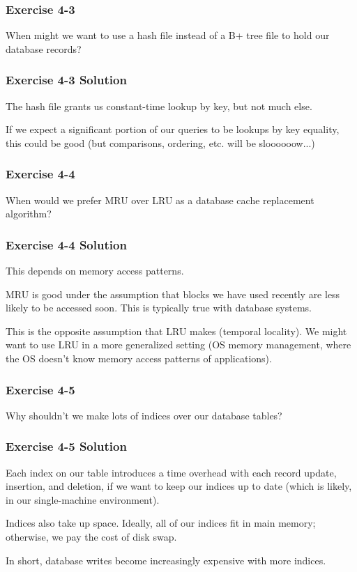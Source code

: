 \begin{frame}
\frametitle{Exercise 4-3}

When might we want to use a hash file instead of a B+ tree file to hold our database records?

\end{frame}


\begin{frame}
\frametitle{Exercise 4-3 Solution}

The hash file grants us constant-time lookup by key, but not much else.

If we expect a significant portion of our queries to be lookups by key equality, this could be good (but comparisons, ordering, etc. will be sloooooow...)

\end{frame}


\begin{frame}
\frametitle{Exercise 4-4}

When would we prefer MRU over LRU as a database cache replacement algorithm?

\end{frame}


\begin{frame}
\frametitle{Exercise 4-4 Solution}

This depends on memory access patterns.

MRU is good under the assumption that blocks we have used recently are less likely to be accessed soon. This is typically true with database systems.

This is the opposite assumption that LRU makes (temporal locality). We might want to use LRU in a more generalized setting (OS memory management, where the OS doesn't know memory access patterns of applications).

\end{frame}


\begin{frame}
\frametitle{Exercise 4-5}

Why shouldn't we make lots of indices over our database tables?

\end{frame}


\begin{frame}
\frametitle{Exercise 4-5 Solution}

Each index on our table introduces a time overhead with each record update, insertion, and deletion, if we want to keep our indices up to date (which is likely, in our single-machine environment).

Indices also take up space. Ideally, all of our indices fit in main memory; otherwise, we pay the cost of disk swap.

In short, database writes become increasingly expensive with more indices.

\end{frame}


